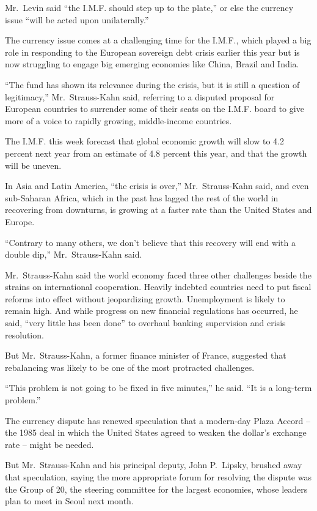 ﻿\documentclass[12pt]{article}
\begin{document}
Mr.~Levin said ``the I.M.F. should step up to the plate,'' or else the currency issue ``will be
acted upon unilaterally.''

The currency issue comes at a challenging time for the I.M.F., which played a big role in responding
to the European sovereign debt crisis earlier this year but is now struggling to engage big emerging
economies like China, Brazil and India.

``The fund has shown its relevance during the crisis, but it is still a question of legitimacy,''
Mr.~Strauss-Kahn said, referring to a disputed proposal for European countries to surrender some of
their seats on the I.M.F. board to give more of a voice to rapidly growing, middle-income countries.

The I.M.F. this week forecast that global economic growth will slow to 4.2 percent next year from an
estimate of 4.8 percent this year, and that the growth will be uneven.

In Asia and Latin America, ``the crisis is over,'' Mr.~Strauss-Kahn said, and even sub-Saharan
Africa, which in the past has lagged the rest of the world in recovering from downturns, is growing
at a faster rate than the United States and Europe.

``Contrary to many others, we don't believe that this recovery will end with a double dip,''
Mr.~Strauss-Kahn said.

Mr.~Strauss-Kahn said the world economy faced three other challenges beside the strains on
international cooperation. Heavily indebted countries need to put fiscal reforms into effect without
jeopardizing growth. Unemployment is likely to remain high. And while progress on new financial
regulations has occurred, he said, ``very little has been done'' to overhaul banking supervision and
crisis resolution.

But Mr.~Strauss-Kahn, a former finance minister of France, suggested that rebalancing was likely to
be one of the most protracted challenges.

``This problem is not going to be fixed in five minutes,'' he said. ``It is a long-term problem.''

The currency dispute has renewed speculation that a modern-day Plaza Accord -- the 1985 deal in
which the United States agreed to weaken the dollar's exchange rate -- might be needed.

But Mr.~Strauss-Kahn and his principal deputy, John P.~Lipsky, brushed away that speculation, saying
the more appropriate forum for resolving the dispute was the Group of 20, the steering committee for
the largest economies, whose leaders plan to meet in Seoul next month.
\end{document}
